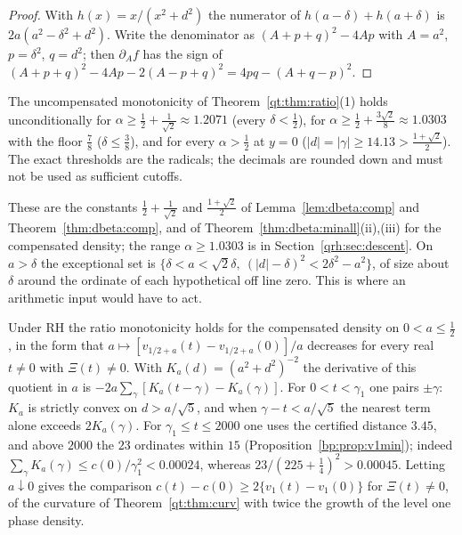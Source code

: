 \begin{proof}
With $h(x)=x/(x^2+d^2)$ the numerator of $h(a-\delta)+h(a+\delta)$ is $2a(a^2-\delta^2+d^2)$. Write the denominator as $(A+p+q)^2-4Ap$ with $A=a^2$, $p=\delta^2$, $q=d^2$; then $\partial_Af$ has the sign of $(A+p+q)^2-4Ap-2(A-p+q)^2=4pq-(A+q-p)^2$.
\end{proof}

\begin{corollary}\label{qt:cor:range}
The uncompensated monotonicity of Theorem~\ref{qt:thm:ratio}(1) holds unconditionally for $\alpha\ge\tfrac12+\tfrac1{\sqrt2}\approx1.2071$ (every $\delta<\tfrac12$), for $\alpha\ge\tfrac12+\tfrac{3\sqrt2}8\approx1.0303$ with the floor $\tfrac78$ \cite{OAI26a} ($\delta\le\tfrac38$), and for every $\alpha>\tfrac12$ at $y=0$ ($|d|=|\gamma|\ge14.13>\tfrac{1+\sqrt2}2$). The exact thresholds are the radicals; the decimals are rounded down and must not be used as sufficient cutoffs.
\end{corollary}

These are the constants $\tfrac12+\tfrac1{\sqrt2}$ and $\tfrac{1+\sqrt2}2$ of Lemma~\ref{lem:dbeta:comp} and Theorem~\ref{thm:dbeta:comp}, and of Theorem~\ref{thm:dbeta:minall}(ii),(iii) for the compensated density; the range $\alpha\ge1.0303$ is in Section~\ref{qrh:sec:descent}. On $a>\delta$ the exceptional set is $\{\delta<a<\sqrt2\delta,\ (|d|-\delta)^2<2\delta^2-a^2\}$, of size about $\delta$ around the ordinate of each hypothetical off line zero. This is where an arithmetic input would have to act.

\begin{remark}\label{qt:rem:cond}
Under RH the ratio monotonicity holds for the compensated density on $0<a\le\tfrac12$, in the form that $a\mapsto[v_{1/2+a}(t)-v_{1/2+a}(0)]/a$ decreases for every real $t\ne0$ with $\Xi(t)\ne0$. With $K_a(d)=(a^2+d^2)^{-2}$ the derivative of this quotient in $a$ is $-2a\sum_\gamma[K_a(t-\gamma)-K_a(\gamma)]$. For $0<t<\gamma_1$ one pairs $\pm\gamma$: $K_a$ is strictly convex on $d>a/\sqrt5$, and when $\gamma-t<a/\sqrt5$ the nearest term alone exceeds $2K_a(\gamma)$. For $\gamma_1\le t\le2000$ one uses the certified distance $3.45$, and above $2000$ the $23$ ordinates within $15$ (Proposition~\ref{bp:prop:v1min}); indeed $\sum_\gamma K_a(\gamma)\le c(0)/\gamma_1^2<0.00024$, whereas $23/(225+\tfrac14)^2>0.00045$. Letting $a\downarrow0$ gives the comparison $c(t)-c(0)\ge2\{v_1(t)-v_1(0)\}$ for $\Xi(t)\ne0$, of the curvature of Theorem~\ref{qt:thm:curv} with twice the growth of the level one phase density.
\end{remark}


